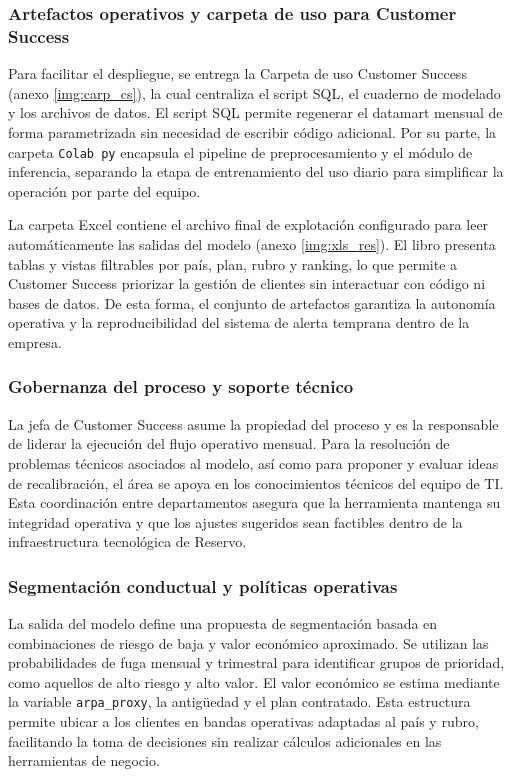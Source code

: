 \subsubsection{Artefactos operativos y carpeta de uso para Customer Success}

Para facilitar el despliegue, se entrega la Carpeta de uso Customer Success (anexo \ref{img:carp_cs}), la cual centraliza el script SQL, el cuaderno de modelado y los archivos de datos. El script SQL permite regenerar el datamart mensual de forma parametrizada sin necesidad de escribir código adicional. Por su parte, la carpeta \texttt{Colab py} encapsula el pipeline de preprocesamiento y el módulo de inferencia, separando la etapa de entrenamiento del uso diario para simplificar la operación por parte del equipo.

La carpeta Excel contiene el archivo final de explotación configurado para leer automáticamente las salidas del modelo (anexo \ref{img:xls_res}). El libro presenta tablas y vistas filtrables por país, plan, rubro y ranking, lo que permite a Customer Success priorizar la gestión de clientes sin interactuar con código ni bases de datos. De esta forma, el conjunto de artefactos garantiza la autonomía operativa y la reproducibilidad del sistema de alerta temprana dentro de la empresa.

\subsubsection{Gobernanza del proceso y soporte técnico}

La jefa de Customer Success asume la propiedad del proceso y es la responsable de liderar la ejecución del flujo operativo mensual. Para la resolución de problemas técnicos asociados al modelo, así como para proponer y evaluar ideas de recalibración, el área se apoya en los conocimientos técnicos del equipo de TI. Esta coordinación entre departamentos asegura que la herramienta mantenga su integridad operativa y que los ajustes sugeridos sean factibles dentro de la infraestructura tecnológica de Reservo.

\subsubsection{Segmentación conductual y políticas operativas}

La salida del modelo define una propuesta de segmentación basada en combinaciones de riesgo de baja y valor económico aproximado. Se utilizan las probabilidades de fuga mensual y trimestral para identificar grupos de prioridad, como aquellos de alto riesgo y alto valor. El valor económico se estima mediante la variable \texttt{arpa\_proxy}, la antigüedad y el plan contratado. Esta estructura permite ubicar a los clientes en bandas operativas adaptadas al país y rubro, facilitando la toma de decisiones sin realizar cálculos adicionales en las herramientas de negocio.

